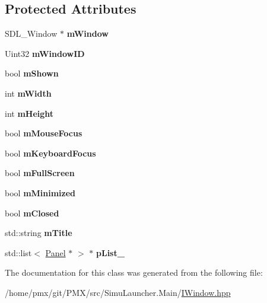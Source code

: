 \subsection*{Protected Attributes}
\begin{DoxyCompactItemize}
\item 
\mbox{\label{classIWindow_acf95854a424a3c05fc8927dc96a1e318}} 
S\+D\+L\+\_\+\+Window $\ast$ {\bfseries m\+Window}
\item 
\mbox{\label{classIWindow_a2424ae3d33c74634a8124530ad88a8b7}} 
Uint32 {\bfseries m\+Window\+ID}
\item 
\mbox{\label{classIWindow_af1a7ab9d3ab4ca8b848ea591a3e2e825}} 
bool {\bfseries m\+Shown}
\item 
\mbox{\label{classIWindow_a741bf44953195a1799295464a6b1f8ec}} 
int {\bfseries m\+Width}
\item 
\mbox{\label{classIWindow_a1ee48ae33e16faa3b3d5f0999e9bad51}} 
int {\bfseries m\+Height}
\item 
\mbox{\label{classIWindow_a36ed563eeb4d957a30effbbbabfc0753}} 
bool {\bfseries m\+Mouse\+Focus}
\item 
\mbox{\label{classIWindow_ac8b06eb166fa4607c2da543c1f23ec56}} 
bool {\bfseries m\+Keyboard\+Focus}
\item 
\mbox{\label{classIWindow_aea08d2b03568be6ceb258459779ab70b}} 
bool {\bfseries m\+Full\+Screen}
\item 
\mbox{\label{classIWindow_a99e7875dd5d670ba1a53e6f21e8e89be}} 
bool {\bfseries m\+Minimized}
\item 
\mbox{\label{classIWindow_add78b737c00f8fe29430fe5464f28bb6}} 
bool {\bfseries m\+Closed}
\item 
\mbox{\label{classIWindow_a960aac9b2be0ea58d13e5ce26909a50b}} 
std\+::string {\bfseries m\+Title}
\item 
\mbox{\label{classIWindow_a985c242f8ac595fde74d2ea5cd818089}} 
std\+::list$<$ \hyperlink{classPanel}{Panel} $\ast$ $>$ $\ast$ {\bfseries p\+List\+\_\+}
\end{DoxyCompactItemize}


The documentation for this class was generated from the following file\+:\begin{DoxyCompactItemize}
\item 
/home/pmx/git/\+P\+M\+X/src/\+Simu\+Launcher.\+Main/\hyperlink{IWindow_8hpp}{I\+Window.\+hpp}\end{DoxyCompactItemize}
